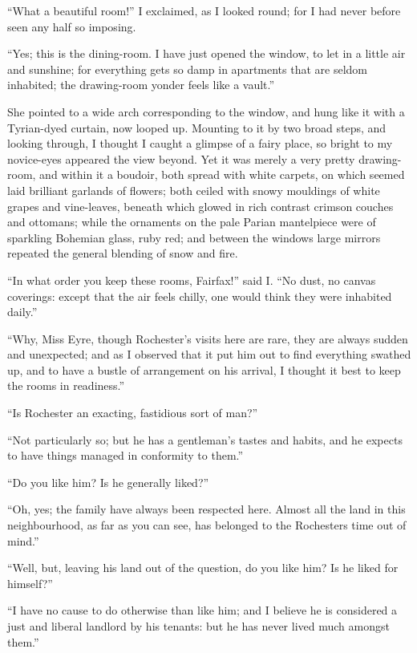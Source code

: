 \enquote{What a beautiful room!} I exclaimed, as I looked round; for I
had never before seen any half so imposing.

\enquote{Yes; this is the dining-room. I have just opened the window,
	to let in a little air and sunshine; for everything gets so damp in
	apartments that are seldom inhabited; the drawing-room yonder feels like
	a vault.}

She pointed to a wide arch corresponding to the window, and hung like it
with a Tyrian-dyed curtain, now looped up. Mounting to it by two broad
steps, and looking through, I thought I caught a glimpse of a fairy
place, so bright to my novice-eyes appeared the view beyond. Yet it was
merely a very pretty drawing-room, and within it a boudoir, both spread
with white carpets, on which seemed laid brilliant garlands of flowers;
both ceiled with snowy mouldings of white grapes and vine-leaves,
beneath which glowed in rich contrast crimson couches and ottomans;
while the ornaments on the pale Parian mantelpiece were of sparkling
Bohemian glass, ruby red; and between the windows large mirrors repeated
the general blending of snow and fire.

\enquote{In what order you keep these rooms, \Mrs{} Fairfax!} said I\@.
\enquote{No dust, no canvas coverings: except that the air feels chilly,
	one would think they were inhabited daily.}

\enquote{Why, Miss Eyre, though \Mr{} Rochester's visits here are rare,
	they are always sudden and unexpected; and as I observed that it put him
	out to find everything swathed up, and to have a bustle of arrangement
	on his arrival, I thought it best to keep the rooms in readiness.}

\enquote{Is \Mr{} Rochester an exacting, fastidious sort of man?}

\enquote{Not particularly so; but he has a gentleman's tastes and
	habits, and he expects to have things managed in conformity to them.}

\enquote{Do you like him? Is he generally liked?}

\enquote{Oh, yes; the family have always been respected here. Almost
	all the land in this neighbourhood, as far as you can see, has belonged
	to the Rochesters time out of mind.}

\enquote{Well, but, leaving his land out of the question, do you like
	him? Is he liked for himself?}

\enquote{I have no cause to do otherwise than like him; and I believe he
	is considered a just and liberal landlord by his tenants: but he has
	never lived much amongst them.}

